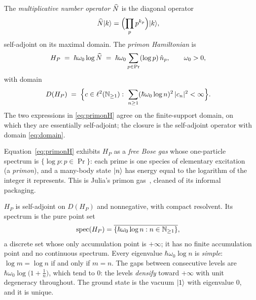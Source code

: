 \begin{definition}\label{def:hamiltonian}
The \emph{multiplicative number operator} $\widehat{N}$ is the diagonal operator
\begin{equation}
\widehat{N}\lvert k\rangle=\Bigl(\prod_{p}p^{k_{p}}\Bigr)\lvert k\rangle,
\end{equation}
self-adjoint on its maximal domain. The \emph{primon Hamiltonian} is
\begin{equation}\label{eq:primonH}
H_{P}\;=\;\hbar\omega_{0}\log\widehat{N}
\;=\;\hbar\omega_{0}\sum_{p\in\Pr}(\log p)\,\hat n_{p},
\qquad \omega_{0}>0,
\end{equation}
with domain
\begin{equation}\label{eq:domain}
D(H_{P})\;=\;\Bigl\{c\in\ell^{2}(\Nn_{\geq1}):\ \sum_{n\geq1}(\hbar\omega_{0}\log n)^{2}\,|c_{n}|^{2}<\infty\Bigr\}.
\end{equation}
The two expressions in \eqref{eq:primonH} agree on the finite-support domain, on which they
are essentially self-adjoint; the closure is the self-adjoint operator with domain
\eqref{eq:domain}.
\end{definition}

Equation~\eqref{eq:primonH} exhibits $H_{P}$ as a \emph{free Bose gas} whose one-particle
spectrum is $\{\log p:p\in\Pr\}$: each prime is one species of elementary excitation (a
\emph{primon}), and a many-body state $\lvert n\rangle$ has energy equal to the logarithm of the
integer it represents. This is Julia's primon gas~\cite{julia1990}, cleaned of its informal
packaging.

\begin{theorem}\label{thm:spectrum}
$H_{P}$ is self-adjoint on $D(H_{P})$ and nonnegative, with compact resolvent. Its spectrum
is the pure point set
\begin{equation}
\operatorname{spec}(H_{P})=\overline{\{\hbar\omega_{0}\log n:n\in\mathbb{N}_{\geq 1}\}},
\end{equation}
a discrete set whose only accumulation point is $+\infty$; it has no finite accumulation
point and no continuous spectrum. Every eigenvalue $\hbar\omega_{0}\log n$ is
\emph{simple}: $\log m=\log n$ if and only if $m=n$. The gaps between consecutive levels are
$\hbar\omega_{0}\log\bigl(1+\tfrac1n\bigr)$, which tend to $0$: the levels \emph{densify}
toward $+\infty$ with unit degeneracy throughout. The ground state is the vacuum
$\lvert 1\rangle$ with eigenvalue $0$, and it is unique.
\end{theorem}

